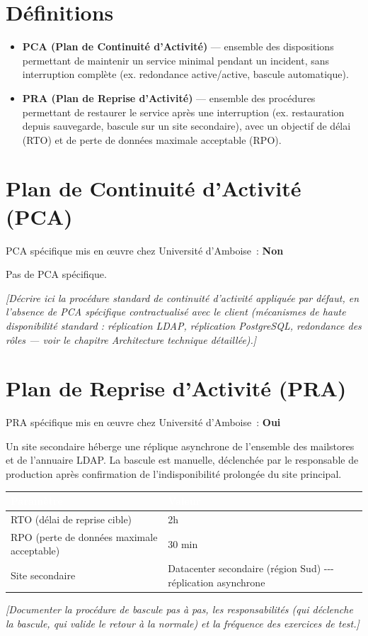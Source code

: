 \documentclass[11pt,a4paper]{report}
\newcommand{\placeholder}[1]{\textit{\textcolor{placeholdercol}{[#1]}}\par\vspace{4pt}}
\newcommand{\tblhead}[1]{\textcolor{white}{\textbf{#1}}}
\begin{document}
\section{Définitions}
\begin{itemize}[nosep]
  \item \textbf{PCA (Plan de Continuité d'Activité)} --- ensemble des dispositions permettant de maintenir un service minimal pendant un incident, sans interruption complète (ex. redondance active/active, bascule automatique).
  \item \textbf{PRA (Plan de Reprise d'Activité)} --- ensemble des procédures permettant de restaurer le service après une interruption (ex. restauration depuis sauvegarde, bascule sur un site secondaire), avec un objectif de délai (RTO) et de perte de données maximale acceptable (RPO).
\end{itemize}

\section{Plan de Continuité d'Activité (PCA)}
PCA spécifique mis en œuvre chez Université d'Amboise~: \textbf{Non}

Pas de PCA spécifique.

\placeholder{Décrire ici la procédure standard de continuité d'activité appliquée par défaut, en l'absence de PCA spécifique contractualisé avec le client (mécanismes de haute disponibilité standard : réplication LDAP, réplication PostgreSQL, redondance des rôles --- voir le chapitre Architecture technique détaillée).}


\section{Plan de Reprise d'Activité (PRA)}
PRA spécifique mis en œuvre chez Université d'Amboise~: \textbf{Oui}

Un site secondaire héberge une réplique asynchrone de l'ensemble des mailstores et de l'annuaire LDAP.\allowbreak{} La bascule est manuelle, déclenchée par le responsable de production après confirmation de l'indisponibilité prolongée du site principal.\allowbreak{}

\begin{longtable}{|p{5.5cm}|p{6.5cm}|}
\hline
\rowcolor{primary}\tblhead{Paramètre} & \tblhead{Valeur} \\
\hline
\endhead
RTO (délai de reprise cible) & 2h \\
\hline
RPO (perte de données maximale acceptable) & 30 min \\
\hline
Site secondaire & Datacenter secondaire (région Sud) -\allowbreak{}-\allowbreak{}-\allowbreak{} réplication asynchrone \\
\hline
\end{longtable}
\placeholder{Documenter la procédure de bascule pas à pas, les responsabilités (qui déclenche la bascule, qui valide le retour à la normale) et la fréquence des exercices de test.}
\end{document}
